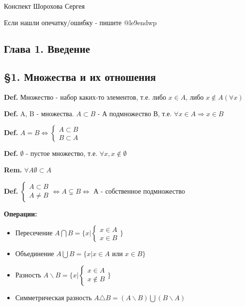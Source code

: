 \documentclass[14pt, letter paper]{article}
\begin{document}
\begin{flushright}
    Конспект Шорохова Сергея

    Если нашли опечатку/ошибку - пишите @le9endwp
\end{flushright}

\begin{center}
    \section*{Глава 1. Введение}

    \subsection*{\S 1. Множества и их отношения}
\end{center}


\textbf{Def.} Множество - набор каких-то элементов, т.е. либо $x \in A$, либо $x \notin A (\forall x)$

\textbf{Def.} A, B - множества. $A \subset B$ - А подмножество В, т.е. $\forall x \in A \Rightarrow x \in B$

\textbf{Def.} $A = B \Leftrightarrow \begin{cases} A \subset B \\ B \subset A \end{cases}$

\textbf{Def.} $\emptyset$ - пустое множество, т.е. $\forall x, x \notin \emptyset$

\textbf{Rem.} $\forall A \emptyset \subset A$

\textbf{Def.} $\begin{cases} A \subset B \\ A \neq B \end{cases} \Leftrightarrow A \subsetneq B \Leftrightarrow$ А - собственное подмножество

\textbf{Операции:}
\begin{itemize}
    \item Пересечение $A \bigcap B = \{ x | \begin{cases} x \in A \\ x \in B \end{cases} \}$
    \item Объединение $A \bigcup B = \{x | x \in A$ или $x \in B \}$
    \item Разность $A \backslash B = \{x | \begin{cases} x \in A \\ x \notin B \end{cases} \}$
    \item Симметрическая разность $A \triangle B = (A \backslash B) \bigcup (B \backslash A)$
\end{itemize}
\end{document}
